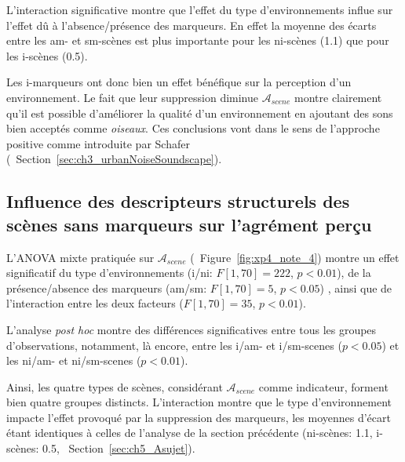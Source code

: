 L'interaction significative montre que l'effet du type d'environnements influe sur l'effet dû à l'absence/présence des marqueurs. En effet la moyenne des écarts entre les am- et sm-scènes est plus importante pour les ni-scènes (1.1) que pour les i-scènes (0.5). 

Les i-marqueurs ont donc bien un effet bénéfique sur la perception d'un environnement. Le fait que leur suppression diminue $\mathcal{A}_{scene}$ montre clairement qu'il est possible d'améliorer la qualité d'un environnement en ajoutant des sons bien acceptés comme \emph{oiseaux}. Ces conclusions vont dans le sens de l'approche positive comme introduite par Schafer \citep{schafer1977tuning} (\cf~Section~\ref{sec:ch3_urbanNoiseSoundscape}). \\


\subsection{Influence des descripteurs structurels des scènes sans marqueurs sur l'agrément perçu}

L'ANOVA mixte pratiquée sur $\mathcal{A}_{scene}$ (\cf~Figure~\ref{fig:xp4_note_4}) montre un effet significatif du type d'environnements (i/ni: $F[1,70]=222$, $p<0.01$), de la présence/absence des marqueurs (am/sm: $F[1,70]=5$, $p<0.05$) , ainsi que de l'interaction entre les deux facteurs ($F[1,70]=35$, $p<0.01$).

L'analyse \emph{post hoc} montre des différences significatives entre tous les groupes d'observations, notamment, là encore, entre les i/am- et i/sm-scenes ($p<0.05$) et les ni/am- et ni/sm-scenes ($p<0.01$).

Ainsi, les quatre types de scènes, considérant $\mathcal{A}_{scene}$ comme indicateur, forment bien quatre groupes distincts. L'interaction montre que le type d'environnement impacte l'effet provoqué par la suppression des marqueurs, les moyennes d'écart étant identiques à celles de l'analyse de la section précédente (ni-scènes: 1.1,  i-scènes: 0.5, \cf~Section~\ref{sec:ch5_Asujet}).
 
